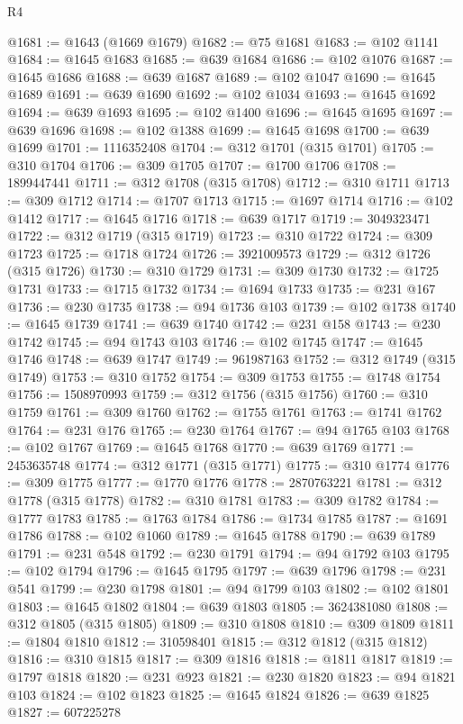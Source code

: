 \begin{lexlean}{R4}
\begin{coremodule}
@1681 := @1643 (@1669 @1679)
@1682 := @75 @1681
@1683 := @102 @1141
@1684 := @1645 @1683
@1685 := @639 @1684
@1686 := @102 @1076
@1687 := @1645 @1686
@1688 := @639 @1687
@1689 := @102 @1047
@1690 := @1645 @1689
@1691 := @639 @1690
@1692 := @102 @1034
@1693 := @1645 @1692
@1694 := @639 @1693
@1695 := @102 @1400
@1696 := @1645 @1695
@1697 := @639 @1696
@1698 := @102 @1388
@1699 := @1645 @1698
@1700 := @639 @1699
@1701 := 1116352408
@1704 := @312 @1701 (@315 @1701)
@1705 := @310 @1704
@1706 := @309 @1705
@1707 := @1700 @1706
@1708 := 1899447441
@1711 := @312 @1708 (@315 @1708)
@1712 := @310 @1711
@1713 := @309 @1712
@1714 := @1707 @1713
@1715 := @1697 @1714
@1716 := @102 @1412
@1717 := @1645 @1716
@1718 := @639 @1717
@1719 := 3049323471
@1722 := @312 @1719 (@315 @1719)
@1723 := @310 @1722
@1724 := @309 @1723
@1725 := @1718 @1724
@1726 := 3921009573
@1729 := @312 @1726 (@315 @1726)
@1730 := @310 @1729
@1731 := @309 @1730
@1732 := @1725 @1731
@1733 := @1715 @1732
@1734 := @1694 @1733
@1735 := @231 @167
@1736 := @230 @1735
@1738 := @94 @1736 @103
@1739 := @102 @1738
@1740 := @1645 @1739
@1741 := @639 @1740
@1742 := @231 @158
@1743 := @230 @1742
@1745 := @94 @1743 @103
@1746 := @102 @1745
@1747 := @1645 @1746
@1748 := @639 @1747
@1749 := 961987163
@1752 := @312 @1749 (@315 @1749)
@1753 := @310 @1752
@1754 := @309 @1753
@1755 := @1748 @1754
@1756 := 1508970993
@1759 := @312 @1756 (@315 @1756)
@1760 := @310 @1759
@1761 := @309 @1760
@1762 := @1755 @1761
@1763 := @1741 @1762
@1764 := @231 @176
@1765 := @230 @1764
@1767 := @94 @1765 @103
@1768 := @102 @1767
@1769 := @1645 @1768
@1770 := @639 @1769
@1771 := 2453635748
@1774 := @312 @1771 (@315 @1771)
@1775 := @310 @1774
@1776 := @309 @1775
@1777 := @1770 @1776
@1778 := 2870763221
@1781 := @312 @1778 (@315 @1778)
@1782 := @310 @1781
@1783 := @309 @1782
@1784 := @1777 @1783
@1785 := @1763 @1784
@1786 := @1734 @1785
@1787 := @1691 @1786
@1788 := @102 @1060
@1789 := @1645 @1788
@1790 := @639 @1789
@1791 := @231 @548
@1792 := @230 @1791
@1794 := @94 @1792 @103
@1795 := @102 @1794
@1796 := @1645 @1795
@1797 := @639 @1796
@1798 := @231 @541
@1799 := @230 @1798
@1801 := @94 @1799 @103
@1802 := @102 @1801
@1803 := @1645 @1802
@1804 := @639 @1803
@1805 := 3624381080
@1808 := @312 @1805 (@315 @1805)
@1809 := @310 @1808
@1810 := @309 @1809
@1811 := @1804 @1810
@1812 := 310598401
@1815 := @312 @1812 (@315 @1812)
@1816 := @310 @1815
@1817 := @309 @1816
@1818 := @1811 @1817
@1819 := @1797 @1818
@1820 := @231 @923
@1821 := @230 @1820
@1823 := @94 @1821 @103
@1824 := @102 @1823
@1825 := @1645 @1824
@1826 := @639 @1825
@1827 := 607225278

\end{coremodule}
\end{lexlean}
